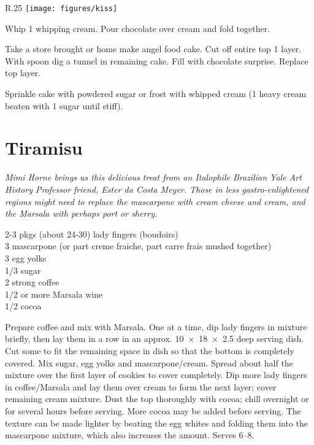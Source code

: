 \begin{wrapfigure}{R}{.25\textwidth}
\centering\texttt{[image: figures/kiss]}
\end{wrapfigure}

Whip \SI{1}{\cup} whipping cream.  Pour chocolate over cream and fold
together.

Take a store brought or home make angel food cake.  Cut off entire top
\SI{1}{\inch} layer.  With spoon dig a tunnel in remaining cake.  Fill with
chocolate surprise.  Replace top layer.

Sprinkle cake with powdered sugar or frost with whipped cream (\SI{1}{\cup}
heavy cream beaten with \SI{1}{\tblspoon} sugar until stiff).

\section{Tiramisu}

\textit{Mimi Horne brings us this delicious treat from an Italophile Brazilian
  Yale Art History Professor friend, Ester da Costa Meyer.  Those in less
  gastro-enlightened regions might need to replace the mascarpone with cream
  cheese and cream, and the Marsala with perhaps port or sherry. }
\begin{ingredients}
  2-3 pkgs (about 24-30) lady fingers (boudoirs) \\
  \SI{3}{\cup} mascarpone (or part creme fraiche, part carre frais mushed together)\\
  3 egg yolks \\
  \SI{1/3}{\cup} sugar \\
  \SI{2}{\cup} strong coffee \\
  \SI{1/2}{\cup} or more Marsala wine \\
  \SI{1/2}{\cup} cocoa
\end{ingredients}
Prepare coffee and mix with Marsala. One at a time, dip lady fingers in
mixture briefly, then lay them in a row in an approx. \SI{10x18x2.5}{\inch}
deep serving dish.  Cut some to fit the remaining space in dish so that the
bottom is completely covered. Mix sugar, egg yolks and
mascarpone/cream. Spread about half the mixture over the first layer of
cookies to cover completely.  Dip more lady fingers in coffee/Marsala and lay
them over cream to form the next layer; cover remaining cream mixture. Dust
the top thoroughly with cocoa; chill overnight or for several hours before
serving. More cocoa may be added before serving. The texture can be made
lighter by beating the egg whites and folding them into the mascarpone
mixture, which also increases the amount.  Serves \numrange{6}{8}.

